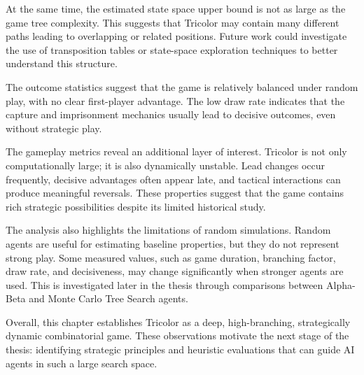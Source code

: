 At the same time, the estimated state space upper bound is not as large as the game tree complexity. This suggests that Tricolor may contain many different paths leading to overlapping or related positions. Future work could investigate the use of transposition tables or state-space exploration techniques to better understand this structure.

The outcome statistics suggest that the game is relatively balanced under random play, with no clear first-player advantage. The low draw rate indicates that the capture and imprisonment mechanics usually lead to decisive outcomes, even without strategic play.

The gameplay metrics reveal an additional layer of interest. Tricolor is not only computationally large; it is also dynamically unstable. Lead changes occur frequently, decisive advantages often appear late, and tactical interactions can produce meaningful reversals. These properties suggest that the game contains rich strategic possibilities despite its limited historical study.

The analysis also highlights the limitations of random simulations. Random agents are useful for estimating baseline properties, but they do not represent strong play. Some measured values, such as game duration, branching factor, draw rate, and decisiveness, may change significantly when stronger agents are used. This is investigated later in the thesis through comparisons between Alpha-Beta and Monte Carlo Tree Search agents.

Overall, this chapter establishes Tricolor as a deep, high-branching, strategically dynamic combinatorial game. These observations motivate the next stage of the thesis: identifying strategic principles and heuristic evaluations that can guide AI agents in such a large search space.


